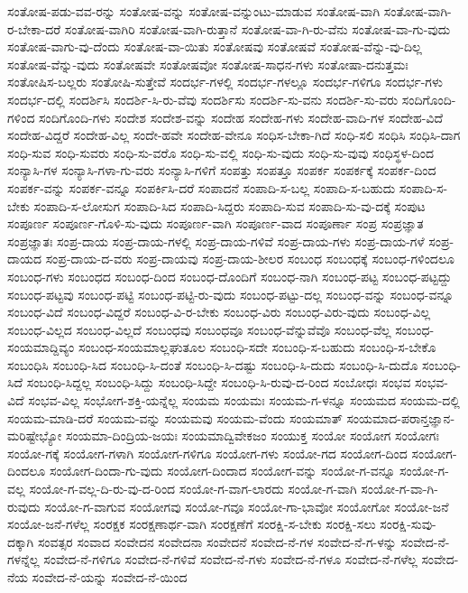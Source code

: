 {ಸಂತೋಷ-ಪಡು-ವವ-ರನ್ನು
ಸಂತೋಷ-ವನ್ನು
ಸಂತೋಷ-ವನ್ನುಂಟು-ಮಾಡುವ
ಸಂತೋಷ-ವಾಗಿ
ಸಂತೋಷ-ವಾಗಿ-ರ-ಬೇಕಾ-ದರೆ
ಸಂತೋಷ-ವಾಗಿರಿ
ಸಂತೋಷ-ವಾಗಿ-ರುತ್ತಾನೆ
ಸಂತೋಷ-ವಾ-ಗಿ-ರು-ವೆನು
ಸಂತೋಷ-ವಾ-ಗು-ವುದು
ಸಂತೋಷ-ವಾಗು-ವು-ದೆಂದು
ಸಂತೋಷ-ವಾ-ಯಿತು
ಸಂತೋಷವು
ಸಂತೋಷವೆ
ಸಂತೋಷ-ವೆನ್ನು-ವು-ದಿಲ್ಲ
ಸಂತೋಷ-ವೆನ್ನು-ವುದು
ಸಂತೋಷವೇ
ಸಂತೋಷವೋ
ಸಂತೋಷ-ಸಾಧನ-ಗಳು
ಸಂತೋಷಾ-ದನುತ್ತಮಃ
ಸಂತೋಷಿಸ-ಬಲ್ಲರು
ಸಂತೋಷಿ-ಸುತ್ತೇವೆ
ಸಂದರ್ಭ-ಗಳಲ್ಲಿ
ಸಂದರ್ಭ-ಗಳಲ್ಲೂ
ಸಂದರ್ಭ-ಗಳಿಗೂ
ಸಂದರ್ಭ-ಗಳು
ಸಂದರ್ಭ-ದಲ್ಲಿ
ಸಂದರ್ಶಿಸಿ
ಸಂದರ್ಶಿ-ಸಿ-ರು-ವೆವು
ಸಂದರ್ಶಿಸು
ಸಂದರ್ಶಿ-ಸು-ವನು
ಸಂದರ್ಶಿ-ಸು-ವರು
ಸಂದಿಗೊಂದಿ-ಗಳಿಂದ
ಸಂದಿಗೊಂದಿ-ಗಳು
ಸಂದೇಶ
ಸಂದೇಶ-ವನ್ನು
ಸಂದೇಹ
ಸಂದೇಹ-ಗಳು
ಸಂದೇಹ-ವಾದಿ-ಗಳ
ಸಂದೇಹ-ವಿದೆ
ಸಂದೇಹ-ವಿದ್ದರೆ
ಸಂದೇಹ-ವಿಲ್ಲ
ಸಂದೇ-ಹವೇ
ಸಂದೇಹ-ವೇನೂ
ಸಂಧಿಸ-ಬೇಕಾ-ಗಿದೆ
ಸಂಧಿ-ಸಲಿ
ಸಂಧಿಸಿ
ಸಂಧಿಸಿ-ದಾಗ
ಸಂಧಿ-ಸುವ
ಸಂಧಿ-ಸುವರು
ಸಂಧಿ-ಸು-ವರೊ
ಸಂಧಿ-ಸು-ವಲ್ಲಿ
ಸಂಧಿ-ಸು-ವುದು
ಸಂಧಿ-ಸು-ವುವು
ಸಂಧಿಸ್ಥಳ-ದಿಂದ
ಸಂನ್ಯಾಸಿ-ಗಳ
ಸಂನ್ಯಾಸಿ-ಗಳಾ-ಗು-ವರು
ಸಂನ್ಯಾಸಿ-ಗಳಿಗೆ
ಸಂಪತ್ತು
ಸಂಪತ್ತೂ
ಸಂಪರ್ಕ
ಸಂಪರ್ಕಕ್ಕೆ
ಸಂಪರ್ಕ-ದಿಂದ
ಸಂಪರ್ಕ-ವನ್ನು
ಸಂಪರ್ಕ-ವನ್ನೂ
ಸಂಪರ್ಕಿಸಿ-ದರೆ
ಸಂಪಾದನೆ
ಸಂಪಾದಿ-ಸ-ಬಲ್ಲ
ಸಂಪಾದಿ-ಸ-ಬಹುದು
ಸಂಪಾದಿ-ಸ-ಬೇಕು
ಸಂಪಾದಿ-ಸ-ಲೋಸುಗ
ಸಂಪಾದಿ-ಸಿದ
ಸಂಪಾದಿ-ಸಿದ್ದರು
ಸಂಪಾದಿ-ಸುವ
ಸಂಪಾದಿ-ಸು-ವು-ದಕ್ಕೆ
ಸಂಪುಟ
ಸಂಪೂರ್ಣ
ಸಂಪೂರ್ಣ-ಗೊಳಿ-ಸು-ವುದು
ಸಂಪೂರ್ಣ-ವಾಗಿ
ಸಂಪೂರ್ಣ-ವಾದ
ಸಂಪೂರ್ಣಾ
ಸಂಪ್ರ
ಸಂಪ್ರಜ್ಞಾತ
ಸಂಪ್ರಜ್ಞಾತಃ
ಸಂಪ್ರ-ದಾಯ
ಸಂಪ್ರ-ದಾಯ-ಗಳಲ್ಲಿ
ಸಂಪ್ರ-ದಾಯ-ಗಳಿವೆ
ಸಂಪ್ರ-ದಾಯ-ಗಳು
ಸಂಪ್ರ-ದಾಯ-ಗಳೆ
ಸಂಪ್ರ-ದಾಯದ
ಸಂಪ್ರ-ದಾಯ-ದ-ವರು
ಸಂಪ್ರ-ದಾಯವು
ಸಂಪ್ರ-ದಾಯ-ಶೀಲರ
ಸಂಬಂಧ
ಸಂಬಂಧಕ್ಕೆ
ಸಂಬಂಧ-ಗಳಿಂದಲೂ
ಸಂಬಂಧ-ಗಳು
ಸಂಬಂಧದ
ಸಂಬಂಧ-ದಿಂದ
ಸಂಬಂಧ-ದೊಂದಿಗೆ
ಸಂಬಂಧ-ನಾಗಿ
ಸಂಬಂಧ-ಪಟ್ಟ
ಸಂಬಂಧ-ಪಟ್ಟದ್ದು
ಸಂಬಂಧ-ಪಟ್ಟವು
ಸಂಬಂಧ-ಪಟ್ಟಿ
ಸಂಬಂಧ-ಪಟ್ಟಿ-ರು-ವುದು
ಸಂಬಂಧ-ಪಟ್ಟು-ದಲ್ಲ
ಸಂಬಂಧ-ವನ್ನು
ಸಂಬಂಧ-ವನ್ನೂ
ಸಂಬಂಧ-ವಿದೆ
ಸಂಬಂಧ-ವಿದ್ದರೆ
ಸಂಬಂಧ-ವಿ-ರ-ಬೇಕು
ಸಂಬಂಧ-ವಿರು
ಸಂಬಂಧ-ವಿರು-ವುದು
ಸಂಬಂಧ-ವಿಲ್ಲ
ಸಂಬಂಧ-ವಿಲ್ಲದ
ಸಂಬಂಧ-ವಿಲ್ಲದೆ
ಸಂಬಂಧವು
ಸಂಬಂಧವೂ
ಸಂಬಂಧ-ವೆನ್ನುವೆವೊ
ಸಂಬಂಧ-ವೆಲ್ಲ
ಸಂಬಂಧ-ಸಂಯಮಾದ್ದಿವ್ಯಂ
ಸಂಬಂಧ-ಸಂಯಮಾಲ್ಲಘುತೂಲ
ಸಂಬಂಧಿ-ಸದೇ
ಸಂಬಂಧಿ-ಸ-ಬಹುದು
ಸಂಬಂಧಿ-ಸ-ಬೇಕೊ
ಸಂಬಂಧಿಸಿ
ಸಂಬಂಧಿ-ಸಿದ
ಸಂಬಂಧಿ-ಸಿ-ದಂತೆ
ಸಂಬಂಧಿ-ಸಿ-ದಷ್ಟು
ಸಂಬಂಧಿ-ಸಿ-ದುದು
ಸಂಬಂಧಿ-ಸಿ-ದುದೊ
ಸಂಬಂಧಿ-ಸಿದೆ
ಸಂಬಂಧಿ-ಸಿದ್ದಲ್ಲ
ಸಂಬಂಧಿ-ಸಿದ್ದು
ಸಂಬಂಧಿ-ಸಿದ್ದೇ
ಸಂಬಂಧಿ-ಸಿ-ರುವು-ದ-ರಿಂದ
ಸಂಬೋಧಃ
ಸಂಭವ
ಸಂಭವ-ವಿದೆ
ಸಂಭವ-ವಿಲ್ಲ
ಸಂಭೋಗ-ಶಕ್ತಿ-ಯನ್ನೆಲ್ಲ
ಸಂಯಮ
ಸಂಯಮಃ
ಸಂಯಮ-ಗ-ಳನ್ನೂ
ಸಂಯಮದ
ಸಂಯಮ-ದಲ್ಲಿ
ಸಂಯಮ-ಮಾಡಿ-ದರೆ
ಸಂಯಮ-ವನ್ನು
ಸಂಯಮವು
ಸಂಯಮ-ವೆಂದು
ಸಂಯಮಾತ್
ಸಂಯಮಾದ-ಪರಾನ್ತಜ್ಞಾನ-ಮರಿಷ್ಟೇಭ್ಯೋ
ಸಂಯಮಾ-ದಿಂದ್ರಿಯ-ಜಯಃ
ಸಂಯಮಾದ್ವಿವೇಕಜಂ
ಸಂಯುಕ್ತ
ಸಂಯೋ
ಸಂಯೋಗ
ಸಂಯೋಗಃ
ಸಂಯೋ-ಗಕ್ಕೆ
ಸಂಯೋಗ-ಗಳಾಗಿ
ಸಂಯೋಗ-ಗಳಿಗೂ
ಸಂಯೋಗ-ಗಳು
ಸಂಯೋ-ಗದ
ಸಂಯೋಗ-ದಿಂದ
ಸಂಯೋಗ-ದಿಂದಲೂ
ಸಂಯೋಗ-ದಿಂದಾ-ಗು-ವುದು
ಸಂಯೋಗ-ದಿಂದಾದ
ಸಂಯೋಗ-ವನ್ನು
ಸಂಯೋ-ಗ-ವನ್ನೂ
ಸಂಯೋ-ಗ-ವಲ್ಲ
ಸಂಯೋ-ಗ-ವಲ್ಲ-ದಿ-ರು-ವು-ದ-ರಿಂದ
ಸಂಯೋ-ಗ-ವಾಗ-ಲಾರದು
ಸಂಯೋ-ಗ-ವಾಗಿ
ಸಂಯೋ-ಗ-ವಾ-ಗಿ-ರುವುದು
ಸಂಯೋ-ಗ-ವಾಗುವ
ಸಂಯೋಗವು
ಸಂಯೋ-ಗವೂ
ಸಂಯೋ-ಗಾ-ಭಾವೋ
ಸಂಯೋಗೋ
ಸಂಯೋ-ಜನೆ
ಸಂಯೋ-ಜನೆ-ಗಳೆಲ್ಲ
ಸಂರಕ್ಷಕ
ಸಂರಕ್ಷಣಾರ್ಥ-ವಾಗಿ
ಸಂರಕ್ಷಣೆಗೆ
ಸಂರಕ್ಷಿ-ಸ-ಬೇಕು
ಸಂರಕ್ಷಿ-ಸಲು
ಸಂರಕ್ಷಿ-ಸುವು-ದಕ್ಕಾಗಿ
ಸಂವತ್ಸರ
ಸಂವಾದ
ಸಂವೇದನ
ಸಂವೇದನಾ
ಸಂವೇದನೆ
ಸಂವೇದ-ನೆ-ಗಳ
ಸಂವೇದ-ನೆ-ಗ-ಳನ್ನು
ಸಂವೇದ-ನೆ-ಗಳನ್ನೆಲ್ಲ
ಸಂವೇದ-ನೆ-ಗಳಿಗೂ
ಸಂವೇದ-ನೆ-ಗಳಿವೆ
ಸಂವೇದ-ನೆ-ಗಳು
ಸಂವೇದ-ನೆ-ಗಳೂ
ಸಂವೇದ-ನೆ-ಗಳೆಲ್ಲ
ಸಂವೇದ-ನೆಯ
ಸಂವೇದ-ನೆ-ಯನ್ನು
ಸಂವೇದ-ನೆ-ಯಿಂದ
}
